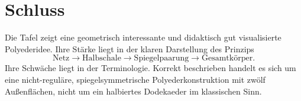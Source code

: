 \documentclass[11pt]{article}
\begin{document}
	\section{Schluss}
	
	Die Tafel zeigt eine geometrisch interessante und didaktisch gut visualisierte Polyederidee. Ihre Stärke liegt in der klaren Darstellung des Prinzips
	\[
	\text{Netz} \longrightarrow \text{Halbschale} \longrightarrow \text{Spiegelpaarung} \longrightarrow \text{Gesamtkörper}.
	\]
	Ihre Schwäche liegt in der Terminologie. Korrekt beschrieben handelt es sich um eine nicht-reguläre, spiegelsymmetrische Polyederkonstruktion mit zwölf Außenflächen, nicht um ein halbiertes Dodekaeder im klassischen Sinn.
	
\end{document}

